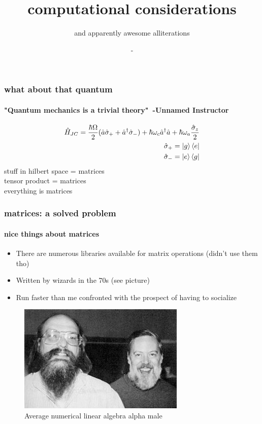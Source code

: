 \documentclass{beamer}
\begin{document}
\title{computational considerations}
\subtitle{and apparently awesome alliterations}
\author[H]{-}
\frame{\titlepage}
\begin{frame}
\frametitle{what about that quantum}
\framesubtitle{"Quantum mechanics is a trivial theory"\ -Unnamed Instructor}
\begin{align}
\hat{H}_{JC} = \frac{\hbar \Omega}{2}(\hat{a}\hat{\sigma} _+ + \hat{a}^\dagger\hat{\sigma}_-) + \hbar \omega _c \hat{a}^\dagger \hat{a} + \hbar \omega _a \frac{\hat{\sigma}_z}{2}\\
\hat{\sigma}_+ = \ket{g}\bra{e} \\
\hat{\sigma}_- = \ket{e}\bra{g}
\end{align}
stuff in hilbert space = matrices\\
tensor product = matrices\\
everything is matrices
\end{frame}
\begin{frame}
\frametitle{matrices: a solved problem}
\framesubtitle{nice things about matrices}
\begin{itemize}
\item There are numerous libraries available for matrix operations (didn't use them tho)
\item Written by wizards in the 70s (see picture)
\item Run faster than me confronted with the prospect of having to socialize
\end{itemize}
\begin{figure}
\includegraphics[scale=0.55]{ken.jpg}
\caption{Average numerical linear algebra alpha male}
\end{figure}

\end{frame}
\end{document}
